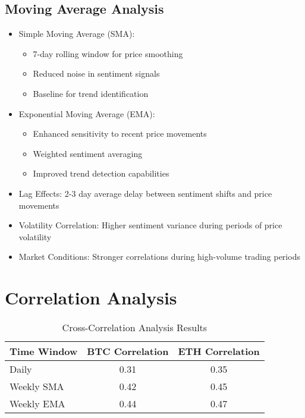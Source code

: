 \documentclass[12pt,a4paper]{report}
\begin{document}
\subsection{Moving Average Analysis}
\begin{itemize}
    \item Simple Moving Average (SMA):
        \begin{itemize}
            \item 7-day rolling window for price smoothing
            \item Reduced noise in sentiment signals
            \item Baseline for trend identification
        \end{itemize}
    \item Exponential Moving Average (EMA):
        \begin{itemize}
            \item Enhanced sensitivity to recent price movements
            \item Weighted sentiment averaging
            \item Improved trend detection capabilities
        \end{itemize}
    \item Lag Effects: 2-3 day average delay between sentiment shifts and price movements
    \item Volatility Correlation: Higher sentiment variance during periods of price volatility
    \item Market Conditions: Stronger correlations during high-volume trading periods
\end{itemize}

\section{Correlation Analysis}
\begin{table}[h]
    \centering
    \begin{tabular}{lcc}
        \toprule
        Time Window & BTC Correlation & ETH Correlation \\
        \midrule
        Daily & 0.31 & 0.35 \\
        Weekly SMA & 0.42 & 0.45 \\
        Weekly EMA & 0.44 & 0.47 \\
        \bottomrule
    \end{tabular}
    \caption{Cross-Correlation Analysis Results}
\end{table}
\end{document}
